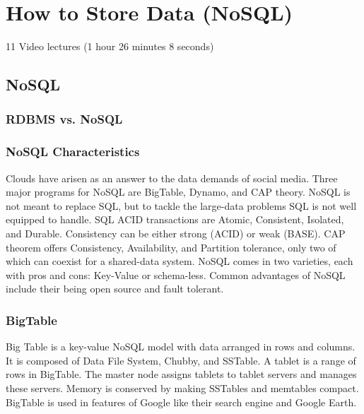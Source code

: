 \part{How to Store Data (NoSQL)}

  11 Video lectures (1 hour 26 minutes 8 seconds)

\chapter{NoSQL}

\section{RDBMS vs. NoSQL}



\section{NoSQL Characteristics}

Clouds have arisen as an answer to the data demands of social media.
Three major programs for NoSQL are BigTable, Dynamo, and CAP theory.
NoSQL is not meant to replace SQL, but to tackle the large-data problems
SQL is not well equipped to handle. SQL ACID transactions are Atomic,
Consistent, Isolated, and Durable. Consistency can be either strong
(ACID) or weak (BASE). CAP theorem offers Consistency, Availability, and
Partition tolerance, only two of which can coexist for a shared-data
system. NoSQL comes in two varieties, each with pros and cons: Key-Value
or schema-less. Common advantages of NoSQL include their being open
source and fault tolerant.



\section{BigTable}

Big Table is a key-value NoSQL model with data arranged in rows and
columns. It is composed of Data File System, Chubby, and SSTable. A
tablet is a range of rows in BigTable. The master node assigns tablets
to tablet servers and manages these servers. Memory is conserved by
making SSTables and memtables compact. BigTable is used in features of
Google like their search engine and Google Earth.

